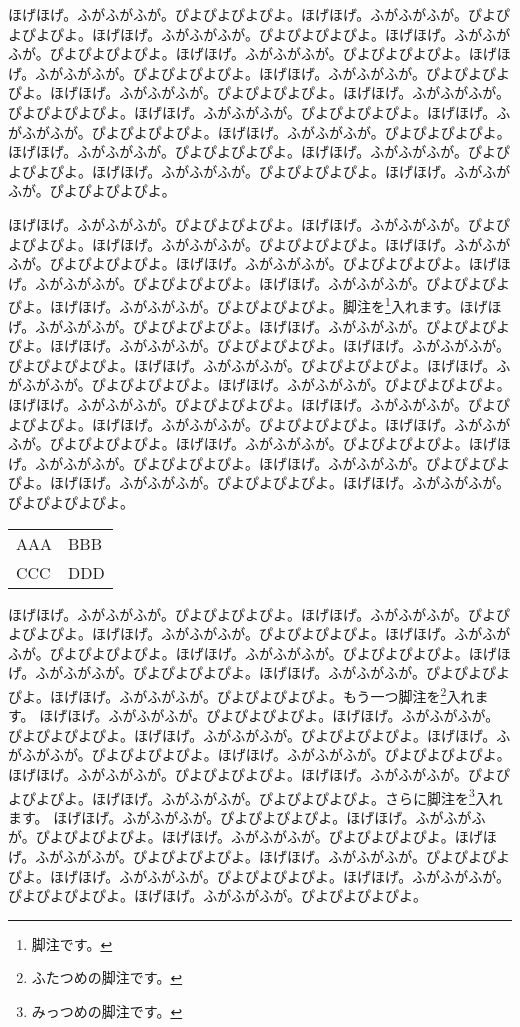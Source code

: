 \documentclass[a4paper,twocolumn]{tarticle}
\def\hoge{ほげほげ。ふがふがふが。ぴよぴよぴよぴよ。} %
\def\HOGE{\hoge\hoge\hoge\hoge\hoge\hoge\hoge\hoge} %
\begin{document}
\HOGE\HOGE

\HOGE 脚注を\footnote{脚注です。}入れます。\HOGE\HOGE

\begin{table}[b]
  \begin{tabular}{ll}
    \hline
    AAA & BBB \\
    CCC & DDD \\
    \hline
  \end{tabular}
\end{table}

\HOGE もう一つ脚注を\footnote{ふたつめの脚注です。}入れます。
\HOGE さらに脚注を\footnote{みっつめの脚注です。}入れます。
\HOGE
\end{document}
